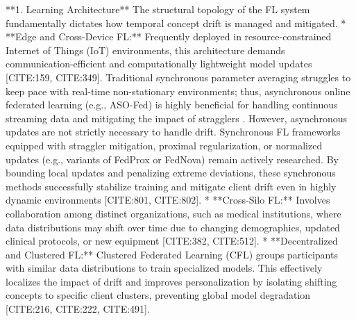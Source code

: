 \documentclass[journal]{IEEEtran}
\begin{document}
**1. Learning Architecture**
The structural topology of the FL system fundamentally dictates how temporal concept drift is managed and mitigated.
*   **Edge and Cross-Device FL:** Frequently deployed in resource-constrained Internet of Things (IoT) environments, this architecture demands communication-efficient and computationally lightweight model updates [CITE:159, CITE:349]. Traditional synchronous parameter averaging struggles to keep pace with real-time non-stationary environments; thus, asynchronous online federated learning (e.g., ASO-Fed) is highly beneficial for handling continuous streaming data and mitigating the impact of stragglers \cite{Chen2020}. However, asynchronous updates are not strictly necessary to handle drift. Synchronous FL frameworks equipped with straggler mitigation, proximal regularization, or normalized updates (e.g., variants of FedProx or FedNova) remain actively researched. By bounding local updates and penalizing extreme deviations, these synchronous methods successfully stabilize training and mitigate client drift even in highly dynamic environments [CITE:801, CITE:802].
*   **Cross-Silo FL:** Involves collaboration among distinct organizations, such as medical institutions, where data distributions may shift over time due to changing demographics, updated clinical protocols, or new equipment [CITE:382, CITE:512].
*   **Decentralized and Clustered FL:** Clustered Federated Learning (CFL) groups participants with similar data distributions to train specialized models. This effectively localizes the impact of drift and improves personalization by isolating shifting concepts to specific client clusters, preventing global model degradation [CITE:216, CITE:222, CITE:491].
\end{document}

